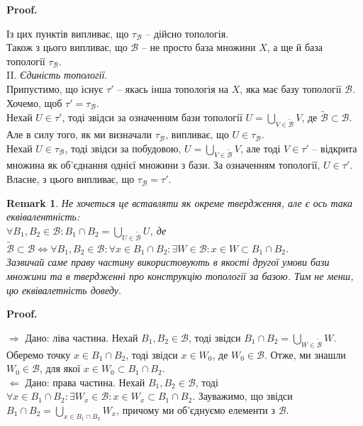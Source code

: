 \documentclass[a4paper, 10pt]{article}
\makeatletter
\def\rightproof{$\boxed{\Rightarrow}$ }
\def\leftproof{$\boxed{\Leftarrow}$ }
\theoremstyle{theoremdd}
\newtheorem{remark}[theorem]{Remark}
\renewenvironment{proof}[1][Proof.\\]{\par
\pushQED{\hfill \qed}%
\normalfont \topsep6\p@\@plus6\p@\relax
\trivlist
\item\relax
{\bfseries
#1\@addpunct{.}}\hspace\labelsep\ignorespaces
}{%
\popQED\endtrivlist\@endpefalse
}
\makeatother
\begin{document}
\begin{proof}
\begin{enumerate}[nosep,wide=0pt,label={\arabic*)}]
\end{enumerate}
Із цих пунктів випливає, що $\tau_\mathcal{B}$ -- дійсно топологія.\\
Також з цього випливає, що $\mathcal{B}$ -- не просто база множини $X$, а ще й база топології $\tau_{\mathcal{B}}$.
\bigskip \\
II. \textit{Єдиність топології}.\\
Припустимо, що існує $\tau'$ -- якась інша топологія на $X$, яка має базу топології $\mathcal{B}$. Хочемо, щоб $\tau' = \tau_{\mathcal{B}}$.\\
Нехай $U \in \tau'$, тоді звідси за означенням бази топології $U = \displaystyle\bigcup_{V \in \mathcal{\tilde{B}}} V$, де $\mathcal{\tilde{B}} \subset \mathcal{B}$. Але в силу того, як ми визначали $\tau_{\mathcal{B}}$, випливає, що $U \in \tau_{\mathcal{B}}$.\\
Нехай $U \in \tau_{\mathcal{B}}$, тоді звідси за побудовою, $U = \displaystyle\bigcup_{V \in \mathcal{\tilde{B}}} V$, але тоді $V \in \tau'$ -- відкрита множина як об'єднання однієї множини з бази. За означенням топології, $U \in \tau'$.\\
Власне, з цього випливає, що $\tau_{\mathcal{B}} = \tau'$.
\end{proof}

\begin{remark}
Не хочеться це вставляти як окреме твердження, але є ось така еквівалентність:\\
$\forall B_1,B_2 \in \mathcal{B}: B_1 \cap B_2 = \displaystyle\bigcup_{U \in \mathcal{\tilde{B}}} U$, де $\mathcal{\tilde{B}} \subset \mathcal{B} \iff \forall B_1,B_2 \in \mathcal{B}: \forall x \in B_1 \cap B_2: \exists W \in \mathcal{B}: x \in W \subset B_1 \cap B_2$.\\
Зазвичай саме праву частину використовують в якості другої умови бази множини та в твердженні про конструкцію топології за базою. Тим не менш, цю еквівалетність доведу.
\end{remark}

\begin{proof}
\rightproof Дано: ліва частина. Нехай $B_1,B_2 \in \mathcal{B}$, тоді звідси $B_1 \cap B_2 = \displaystyle\bigcup_{W \in \mathcal{\tilde{B}}} W$. Оберемо точку $x \in B_1 \cap B_2$, тоді звідси $x \in W_0$, де $W_0 \in \mathcal{B}$. Отже, ми знашли $W_0 \in \mathcal{B}$, для якої $x \in W_0 \subset B_1 \cap B_2$.
\bigskip \\
\leftproof Дано: права частина. Нехай $B_1,B_2 \in \mathcal{B}$, тоді $\forall x \in B_1 \cap B_2: \exists W_x \in \mathcal{B}: x \in W_x \subset B_1 \cap B_2$. Зауважимо, що звідси $B_1 \cap B_2 = \displaystyle\bigcup_{x \in B_1 \cap B_2} W_x$, причому ми об'єднуємо елементи з $\mathcal{B}$. 
\end{proof}
\end{document}
